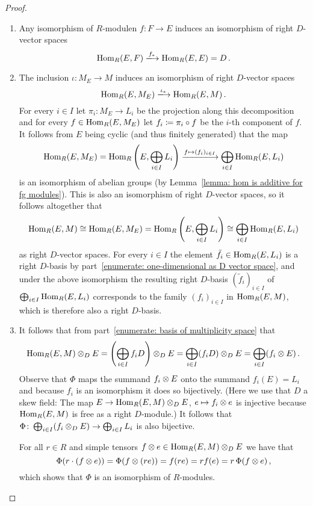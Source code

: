 \begin{proof}
  \leavevmode
  \begin{enumerate}
    \item
      Any isomorphism of $R$-modulen $f \colon F \to E$ induces an isomorphism of right $D$-vector spaces
      \[
                              \Hom_R(E,F)
        \xlongrightarrow{f_*} \Hom_R(E,E)
        =                     D \,.
      \]
    \item
      The inclusion $\iota \colon M_E \to M$ induces an isomorphism of right $D$-vector spaces
      \[
                                  \Hom_R(E, M_E)
        \xlongrightarrow{\iota_*} \Hom_R(E, M) \,.
      \]
      For every $i \in I$ let $\pi_i \colon M_E \to L_i$ be the projection along this decomposition and for every $f \in \operatorname{Hom}_R(E,M_E)$ let $f_i \coloneqq \pi_i \circ f$ be the $i$-th component of $f$.
      It follows from $E$ being cyclic (and thus finitely generated) that the map
      \[
              \Hom_R(E, M_E)
        =     \Hom_R\left(E, \bigoplus_{i \in I} L_i \right)
        \xlongrightarrow{f \mapsto (f_i)_{i \in I}}
              \bigoplus_{i \in I} \Hom_R(E, L_i)
      \]
      is an isomorphism of abelian groups (by Lemma~\ref{lemma: hom is additive for fg modules}).
      This is also an isomorphism of right $D$-vector spaces, so it follows altogether that
      \[
              \operatorname{Hom}_R(E, M)
        \cong \operatorname{Hom}_R(E, M_E)
        =     \operatorname{Hom}_R\left( E, \bigoplus_{i \in I} L_i \right)
        \cong \bigoplus_{i \in I} \operatorname{Hom}_R(E, L_i)
      \]
      as right $D$-vector spaces.
      For every $i \in I$ the element $\tilde{f}_i \in \operatorname{Hom}_R(E, L_i)$ is a right $D$-basis by part~\ref*{enumerate: one-dimensional as D vector space}, and under the above isomorphism the resulting right $D$-basis $(\tilde{f}_i)_{i \in I}$ of $\bigoplus_{i \in I} \operatorname{Hom}_R(E, L_i)$ corresponds to the family $(f_i)_{i \in I}$ in $\operatorname{Hom}_R(E,M)$, which is therefore also a right $D$-basis.
    \item
      It follows that from part~\ref*{enumerate: basis of multiplicity space} that
      \[
          \operatorname{Hom}_R(E, M) \mathbin{\otimes}_D E
        = \left( \bigoplus_{i \in I} f_i D \right) \mathbin{\otimes}_D E
        = \bigoplus_{i \in I} (f_i D) \mathbin{\otimes}_D E
        = \bigoplus_{i \in I} (f_i \mathbin{\otimes} E) \,.
      \]
      Observe that $\Phi$ maps the summand $f_i \mathbin{\otimes} E$ onto the summand $f_i(E) = L_i$ and because $f_i$ is an isomorphism it does so bijectively.
      (Here we use that $D$ a skew field:
      The map $E \to \operatorname{Hom}_R(E, M) \mathbin{\otimes}_D E$, $e \mapsto f_i \mathbin{\otimes} e$ is injective because $\operatorname{Hom}_R(E,M)$ is free as a right $D$-module.)
      It follows that $\Phi \colon \bigoplus_{i \in I} (f_i \mathbin{\otimes}_D E) \to \bigoplus_{i \in I} L_i$ is also bijective.
      
      For all $r \in R$ and simple tensors $f \mathbin{\otimes} e \in \operatorname{Hom}_R(E,M) \mathbin{\otimes}_D E$ we have that
      \[
          \Phi(r \cdot (f \mathbin{\otimes} e))
        = \Phi(f \mathbin{\otimes} (re))
        = f(re)
        = r f(e)
        = r \, \Phi(f \mathbin{\otimes} e) \,,
      \]
      which shows that $\Phi$ is an isomorphism of $R$-modules.
    \qedhere
  \end{enumerate}
\end{proof}



